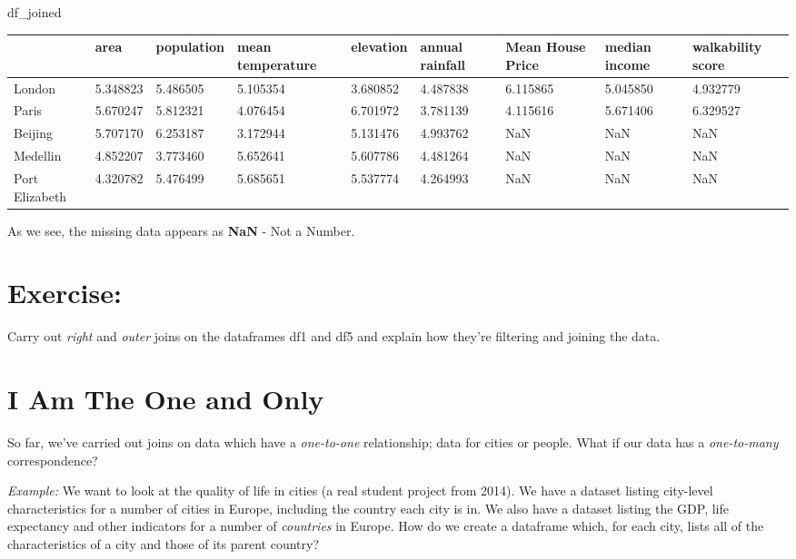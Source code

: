 \documentclass[
  letterpaper,
  DIV=11,
  numbers=noendperiod]{scrreprt}
\newenvironment{Shaded}{\begin{snugshade}}{\end{snugshade}}
\newcommand{\NormalTok}[1]{\textcolor[rgb]{0.00,0.23,0.31}{#1}}
\begin{document}
\begin{Shaded}
\begin{Highlighting}[]
\NormalTok{df\_joined}
\end{Highlighting}
\end{Shaded}

\begin{longtable}[]{@{}lllllllll@{}}
\toprule()
& area & population & mean temperature & elevation & annual rainfall &
Mean House Price & median income & walkability score \\
\midrule()
\endhead
London & 5.348823 & 5.486505 & 5.105354 & 3.680852 & 4.487838 & 6.115865
& 5.045850 & 4.932779 \\
Paris & 5.670247 & 5.812321 & 4.076454 & 6.701972 & 3.781139 & 4.115616
& 5.671406 & 6.329527 \\
Beijing & 5.707170 & 6.253187 & 3.172944 & 5.131476 & 4.993762 & NaN &
NaN & NaN \\
Medellin & 4.852207 & 3.773460 & 5.652641 & 5.607786 & 4.481264 & NaN &
NaN & NaN \\
Port Elizabeth & 4.320782 & 5.476499 & 5.685651 & 5.537774 & 4.264993 &
NaN & NaN & NaN \\
\bottomrule()
\end{longtable}

As we see, the missing data appears as \textbf{NaN} - Not a Number.

\hypertarget{exercise-13}{%
\section{Exercise:}\label{exercise-13}}

Carry out \emph{right} and \emph{outer} joins on the dataframes df1 and
df5 and explain how they're filtering and joining the data.

\hypertarget{i-am-the-one-and-only}{%
\section{I Am The One and Only}\label{i-am-the-one-and-only}}

So far, we've carried out joins on data which have a \emph{one-to-one}
relationship; data for cities or people. What if our data has a
\emph{one-to-many} correspondence?

\emph{Example:} We want to look at the quality of life in cities (a real
student project from 2014). We have a dataset listing city-level
characteristics for a number of cities in Europe, including the country
each city is in. We also have a dataset listing the GDP, life expectancy
and other indicators for a number of \emph{countries} in Europe. How do
we create a dataframe which, for each city, lists all of the
characteristics of a city and those of its parent country?
\end{document}
